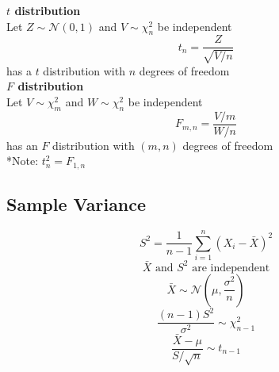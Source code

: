 \documentclass{article}
\begin{document}
\begin{multicols}{2}
\textbf{$t$ distribution}\\
Let $Z \sim \mathcal{N}(0,1)$ and $V \sim \chi^2_n$ be independent
$$t_n = \frac{Z}{\sqrt{V/n}}$$ has a $t$ distribution with $n$ degrees of freedom\\

\textbf{$F$ distribution}\\
Let $V \sim \chi_m^2$ and $W \sim \chi^2_n$ be independent
$$F_{m,n} = \frac{V/m}{W/n}$$ has an $F$ distribution with $(m,n)$ degrees of freedom\\
*Note: $t_n^2 = F_{1,n}$

\subsection{Sample Variance}
$$S^2 = \frac{1}{n-1}\sum_{i=1}^{n}(X_i-\bar{X})^2$$
$$\bar{X} \text{ and } S^2 \text{ are independent}$$
$$\bar{X} \sim \mathcal{N}\left(\mu,\frac{\sigma^2}{n}\right)$$
$$\frac{(n-1)S^2}{\sigma^2}\sim \chi^2_{n-1}$$
$$\frac{\bar{X}-\mu}{S/\sqrt{n}} \sim t_{n-1}$$

\end{multicols}
\end{document}

